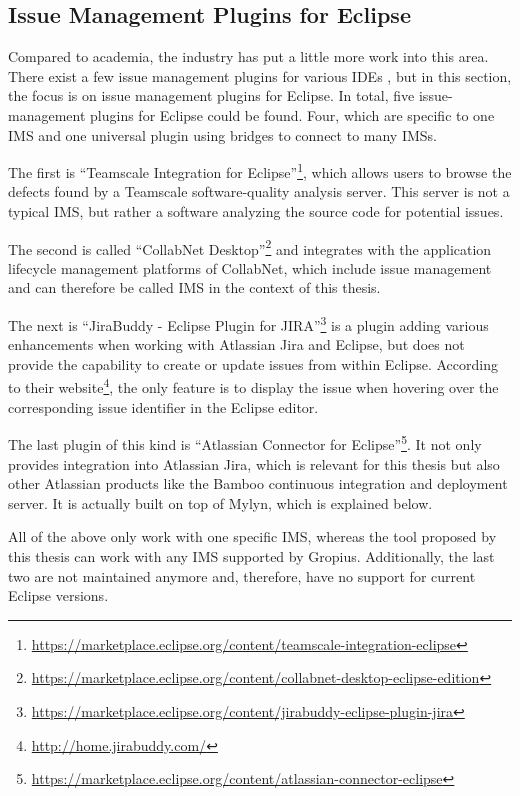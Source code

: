 \subsection{Issue Management Plugins for Eclipse}
\label{ssec:ch2:ss2.3}
Compared to academia, the industry has put a little more work into this area.
There exist a few issue management plugins for various \glspl{IDE} \cite{janak2009issue}, 
but in this section, the focus is on issue management plugins for \gls{Eclipse}.
In total, five issue-management plugins for \gls{Eclipse} could be found.
Four, which are specific to one \gls{IMS} and one universal plugin using bridges to connect to many \glspl{IMS}.

The first is ``Teamscale Integration for Eclipse''\footnote{\url{https://marketplace.eclipse.org/content/teamscale-integration-eclipse}}, 
which allows users to browse the defects found by a Teamscale software‐quality analysis server.
This server is not a typical \gls{IMS}, but rather a software analyzing the source code for potential issues.

The second is called ``CollabNet Desktop''\footnote{\url{https://marketplace.eclipse.org/content/collabnet-desktop-eclipse-edition}} and 
integrates with the application lifecycle management platforms of CollabNet, which include issue management and can therefore be called \gls{IMS} in the context of this thesis.

The next is ``JiraBuddy - Eclipse Plugin for JIRA''\footnote{\url{https://marketplace.eclipse.org/content/jirabuddy-eclipse-plugin-jira}}
is a plugin adding various enhancements when working with Atlassian Jira and \gls{Eclipse}, but does not provide the capability to create or update
issues from within \gls{Eclipse}. According to their website\footnote{\url{http://home.jirabuddy.com/}}, the only feature is to display the issue when hovering over the corresponding issue identifier in the \gls{Eclipse} editor.

The last plugin of this kind is ``Atlassian Connector for Eclipse''\footnote{\url{https://marketplace.eclipse.org/content/atlassian-connector-eclipse}}.
It not only provides integration into Atlassian Jira, which is relevant for this thesis but also other Atlassian products like the Bamboo continuous integration and deployment server.
It is actually built on top of Mylyn, which is explained below.

All of the above only work with one specific \gls{IMS}, whereas the tool proposed by this thesis can work with any \gls{IMS} supported by \gls{Gropius}.
Additionally, the last two are not maintained anymore and, therefore, have no support for current \gls{Eclipse} versions. 

